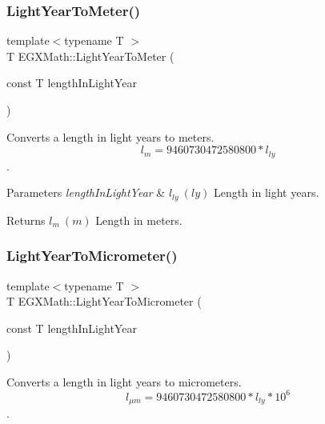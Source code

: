 \subsubsection{\texorpdfstring{Light\+Year\+To\+Meter()}{LightYearToMeter()}}
{\footnotesize\ttfamily template$<$typename T $>$ \\
T E\+G\+X\+Math\+::\+Light\+Year\+To\+Meter (\begin{DoxyParamCaption}\item[{const T}]{length\+In\+Light\+Year }\end{DoxyParamCaption})}



Converts a length in light years to meters. \[ l_{m}=9460730472580800 * l_{ly} \]. 


\begin{DoxyParams}{Parameters}
{\em length\+In\+Light\+Year} & $ l_{ly}\ (ly)$ Length in light years. \\
\hline
\end{DoxyParams}
\begin{DoxyReturn}{Returns}
$ l_{m}\ (m)$ Length in meters. 
\end{DoxyReturn}
\mbox{\label{group___e_g_x_math-_conversions-_length_conversions-_astronomical-_light_year-_s_i_gaa3dbed351199e0c91fb3e72aea833233}} 
\subsubsection{\texorpdfstring{Light\+Year\+To\+Micrometer()}{LightYearToMicrometer()}}
{\footnotesize\ttfamily template$<$typename T $>$ \\
T E\+G\+X\+Math\+::\+Light\+Year\+To\+Micrometer (\begin{DoxyParamCaption}\item[{const T}]{length\+In\+Light\+Year }\end{DoxyParamCaption})}



Converts a length in light years to micrometers. \[ l_{\mu m}=9460730472580800 * l_{ly} * 10^{6} \]. 


